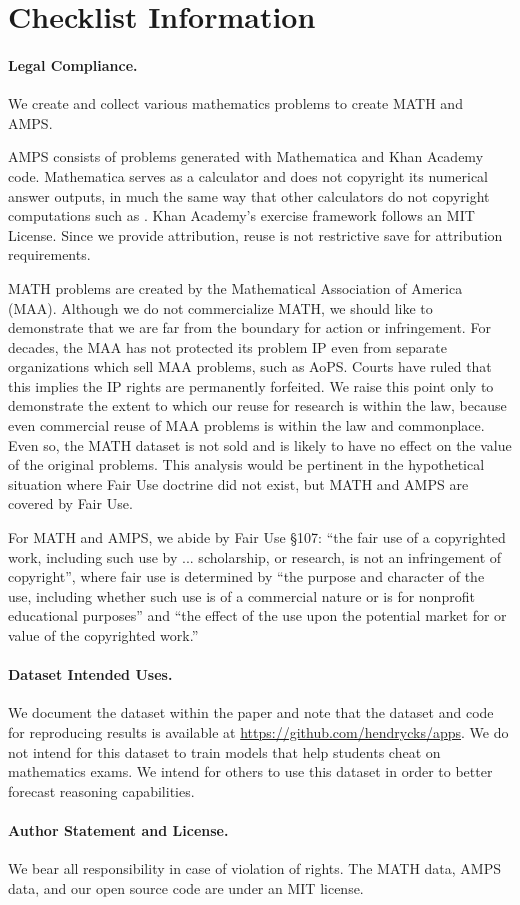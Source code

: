 \documentclass{article}
\begin{document}
\section{Checklist Information}\label{appendix:checklist}
\paragraph{Legal Compliance.}
We create and collect various mathematics problems to create MATH and AMPS.

AMPS consists of problems generated with Mathematica and Khan Academy code. Mathematica serves as a calculator and does not copyright its numerical answer outputs, in much the same way that other calculators do not copyright computations such as . Khan Academy's exercise framework follows an MIT License. Since we provide attribution, reuse is not restrictive save for attribution requirements.

MATH problems are created by the Mathematical Association of America (MAA). Although we do not commercialize MATH, we should like to demonstrate that we are far from the boundary for action or infringement. For decades, the MAA has not protected its problem IP even from separate organizations which sell MAA problems, such as AoPS. Courts have ruled that this implies the IP rights are permanently forfeited. We raise this point only to demonstrate the extent to which our reuse for research is within the law, because even commercial reuse of MAA problems is within the law and commonplace. Even so, the MATH dataset is not sold and is likely to have no effect on the value of the original problems. This analysis would be pertinent in the hypothetical situation where Fair Use doctrine did not exist, but MATH and AMPS are covered by Fair Use.

For MATH and AMPS, we abide by Fair Use §107: ``the fair use of a copyrighted work, including such use by ... scholarship, or research, is not an infringement of copyright'', where fair use is determined by ``the purpose and character of the use, including whether such use is of a commercial nature or is for nonprofit educational purposes'' and ``the effect of the use upon the potential market for or value of the copyrighted work.''

\paragraph{Dataset Intended Uses.} We document the dataset within the paper and note that the dataset and code for reproducing results is available at \href{https://github.com/hendrycks/apps}{https://github.com/hendrycks/apps}. We do not intend for this dataset to train models that help students cheat on mathematics exams. We intend for others to use this dataset in order to better forecast reasoning capabilities.

\paragraph{Author Statement and License.}
We bear all responsibility in case of violation of rights. The MATH data, AMPS data, and our open source code are under an MIT license.
 
\end{document}
